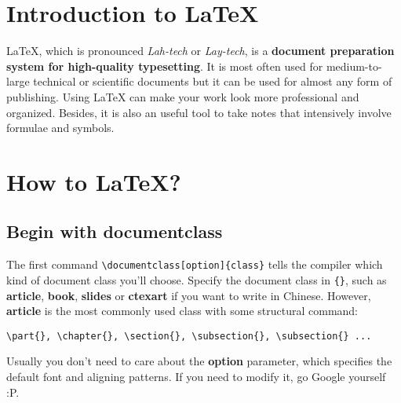 \documentclass[]{article}
\title{\ttfamily{\LaTeX \;Intro Manual}}
\author{\ttfamily{jan\_chen}}
\date{\ttfamily{September 2023}}
\begin{document}
\maketitle

\section{Introduction to \LaTeX}

LaTeX, which is pronounced 
\textit{Lah-tech} or \textit{Lay-tech}, is a \textbf{document preparation system for high-quality typesetting}. It is most often used for medium-to-large technical or scientific documents but it can be used for almost any form of publishing. Using LaTeX can make your work look more professional and organized. Besides, it is also an useful tool to take notes that intensively involve formulae and symbols.

\section{How to \LaTeX \quad?}

\subsection{Begin with documentclass}
The first command \verb|\documentclass[option]{class}| tells the compiler which kind of document class you'll choose. Specify the document class in \verb|{}|, such as \textbf{article}, \textbf{book}, \textbf{slides} or \textbf{ctexart} if you want to write in Chinese. However, \textbf{article} is the most commonly used class with some structural command:
\begin{lstlisting}[basicstyle = \ttfamily]
\part{}, \chapter{}, \section{}, \subsection{}, \subsection{} ...
\end{lstlisting}
Usually you don't need to care about the \textbf{option} parameter, which specifies the default font and aligning patterns. If you need to modify it, go Google yourself :P.
\end{document}
